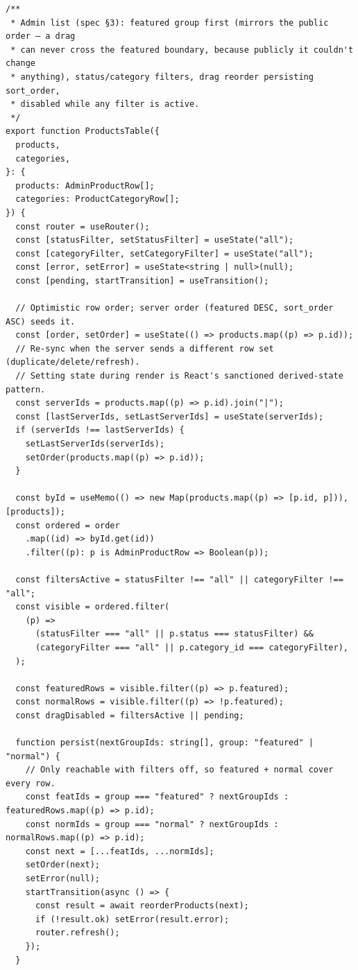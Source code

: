 \documentclass[11pt,a4paper]{article}
\begin{document}
\begin{lstlisting}
/**
 * Admin list (spec §3): featured group first (mirrors the public order — a drag
 * can never cross the featured boundary, because publicly it couldn't change
 * anything), status/category filters, drag reorder persisting sort_order,
 * disabled while any filter is active.
 */
export function ProductsTable({
  products,
  categories,
}: {
  products: AdminProductRow[];
  categories: ProductCategoryRow[];
}) {
  const router = useRouter();
  const [statusFilter, setStatusFilter] = useState("all");
  const [categoryFilter, setCategoryFilter] = useState("all");
  const [error, setError] = useState<string | null>(null);
  const [pending, startTransition] = useTransition();

  // Optimistic row order; server order (featured DESC, sort_order ASC) seeds it.
  const [order, setOrder] = useState(() => products.map((p) => p.id));
  // Re-sync when the server sends a different row set (duplicate/delete/refresh).
  // Setting state during render is React's sanctioned derived-state pattern.
  const serverIds = products.map((p) => p.id).join("|");
  const [lastServerIds, setLastServerIds] = useState(serverIds);
  if (serverIds !== lastServerIds) {
    setLastServerIds(serverIds);
    setOrder(products.map((p) => p.id));
  }

  const byId = useMemo(() => new Map(products.map((p) => [p.id, p])), [products]);
  const ordered = order
    .map((id) => byId.get(id))
    .filter((p): p is AdminProductRow => Boolean(p));

  const filtersActive = statusFilter !== "all" || categoryFilter !== "all";
  const visible = ordered.filter(
    (p) =>
      (statusFilter === "all" || p.status === statusFilter) &&
      (categoryFilter === "all" || p.category_id === categoryFilter),
  );

  const featuredRows = visible.filter((p) => p.featured);
  const normalRows = visible.filter((p) => !p.featured);
  const dragDisabled = filtersActive || pending;

  function persist(nextGroupIds: string[], group: "featured" | "normal") {
    // Only reachable with filters off, so featured + normal cover every row.
    const featIds = group === "featured" ? nextGroupIds : featuredRows.map((p) => p.id);
    const normIds = group === "normal" ? nextGroupIds : normalRows.map((p) => p.id);
    const next = [...featIds, ...normIds];
    setOrder(next);
    setError(null);
    startTransition(async () => {
      const result = await reorderProducts(next);
      if (!result.ok) setError(result.error);
      router.refresh();
    });
  }


\end{lstlisting}
\end{document}
